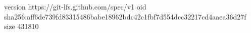 version https://git-lfs.github.com/spec/v1
oid sha256:aff6de739fd83315486babe18962bdc42c1fbf7d554dcc32217cd4aaea36d27f
size 431810
